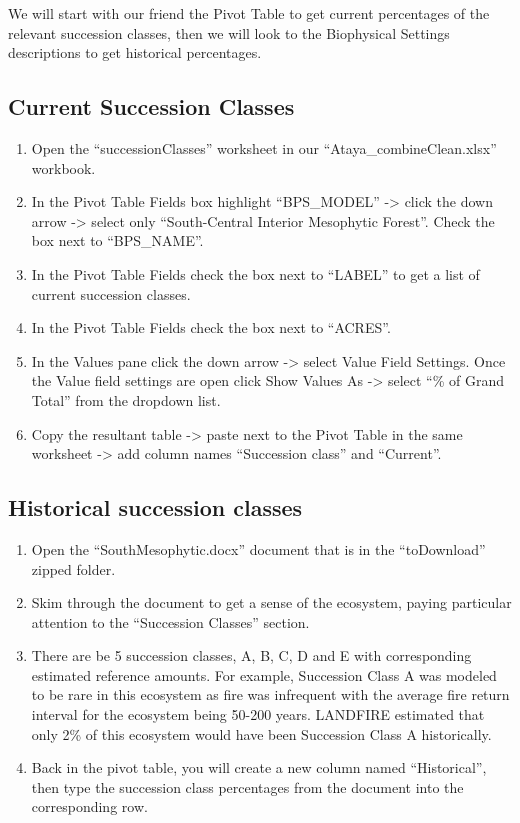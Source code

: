 \documentclass[
]{book}
\providecommand{\tightlist}{%
  \setlength{\itemsep}{0pt}\setlength{\parskip}{0pt}}
\begin{document}
We will start with our friend the Pivot Table to get current percentages of the relevant succession classes, then we will look to the Biophysical Settings descriptions to get historical percentages.

\hypertarget{current-succession-classes}{%
\subsection{Current Succession Classes}\label{current-succession-classes}}

\begin{enumerate}
\def\labelenumi{\arabic{enumi}.}
\tightlist
\item
  Open the ``successionClasses'' worksheet in our ``Ataya\_combineClean.xlsx'' workbook.
\item
  In the Pivot Table Fields box highlight ``BPS\_MODEL'' -\textgreater{} click the down arrow -\textgreater{} select only ``South-Central Interior Mesophytic Forest''. Check the box next to ``BPS\_NAME''.
\item
  In the Pivot Table Fields check the box next to ``LABEL'' to get a list of current succession classes.
\item
  In the Pivot Table Fields check the box next to ``ACRES''.
\item
  In the Values pane click the down arrow -\textgreater{} select Value Field Settings. Once the Value field settings are open click Show Values As -\textgreater{} select ``\% of Grand Total'' from the dropdown list.
\item
  Copy the resultant table -\textgreater{} paste next to the Pivot Table in the same worksheet -\textgreater{} add column names ``Succession class'' and ``Current''.
\end{enumerate}

\hypertarget{historical-succession-classes}{%
\subsection{Historical succession classes}\label{historical-succession-classes}}

\begin{enumerate}
\def\labelenumi{\arabic{enumi}.}
\tightlist
\item
  Open the ``SouthMesophytic.docx'' document that is in the ``toDownload'' zipped folder.\\
\item
  Skim through the document to get a sense of the ecosystem, paying particular attention to the ``Succession Classes'' section.
\item
  There are be 5 succession classes, A, B, C, D and E with corresponding estimated reference amounts. For example, Succession Class A was modeled to be rare in this ecosystem as fire was infrequent with the average fire return interval for the ecosystem being 50-200 years. LANDFIRE estimated that only 2\% of this ecosystem would have been Succession Class A historically.
\item
  Back in the pivot table, you will create a new column named ``Historical'', then type the succession class percentages from the document into the corresponding row.
\end{enumerate}
\end{document}
